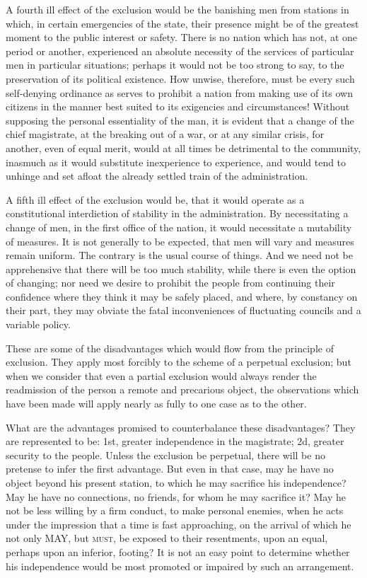 A fourth ill effect of the exclusion would be the banishing men from stations in which, in certain emergencies of the state, their presence might be of the greatest moment to the public interest or safety. There is no nation which has not, at one period or another, experienced an absolute necessity of the services of particular men in particular situations; perhaps it would not be too strong to say, to the preservation of its political existence. How unwise, therefore, must be every such self-denying ordinance as serves to prohibit a nation from making use of its own citizens in the manner best suited to its exigencies and circumstances! Without supposing the personal essentiality of the man, it is evident that a change of the chief magistrate, at the breaking out of a war, or at any similar crisis, for another, even of equal merit, would at all times be detrimental to the community, inasmuch as it would substitute inexperience to experience, and would tend to unhinge and set afloat the already settled train of the administration.

A fifth ill effect of the exclusion would be, that it would operate as a constitutional interdiction of stability in the administration. By necessitating a change of men, in the first office of the nation, it would necessitate a mutability of measures. It is not generally to be expected, that men will vary and measures remain uniform. The contrary is the usual course of things. And we need not be apprehensive that there will be too much stability, while there is even the option of changing; nor need we desire to prohibit the people from continuing their confidence where they think it may be safely placed, and where, by constancy on their part, they may obviate the fatal inconveniences of fluctuating councils and a variable policy.

These are some of the disadvantages which would flow from the principle of exclusion. They apply most forcibly to the scheme of a perpetual exclusion; but when we consider that even a partial exclusion would always render the readmission of the person a remote and precarious object, the observations which have been made will apply nearly as fully to one case as to the other.

What are the advantages promised to counterbalance these disadvantages? They are represented to be: 1st, greater independence in the magistrate; 2d, greater security to the people. Unless the exclusion be perpetual, there will be no pretense to infer the first advantage. But even in that case, may he have no object beyond his present station, to which he may sacrifice his independence? May he have no connections, no friends, for whom he may sacrifice it? May he not be less willing by a firm conduct, to make personal enemies, when he acts under the impression that a time is fast approaching, on the arrival of which he not only MAY, but \textsc{must}, be exposed to their resentments, upon an equal, perhaps upon an inferior, footing? It is not an easy point to determine whether his independence would be most promoted or impaired by such an arrangement.

